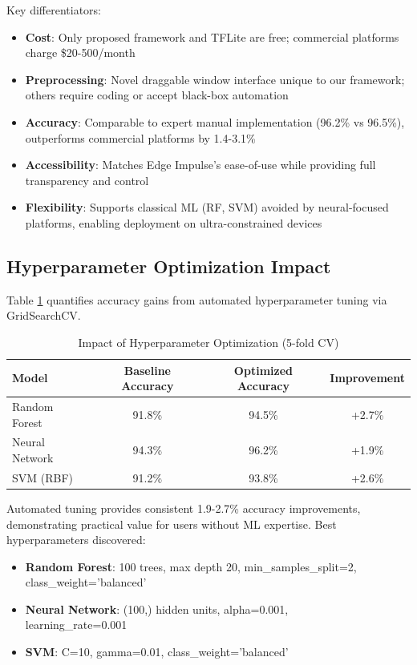 Key differentiators:
\begin{itemize}
    \item \textbf{Cost}: Only proposed framework and TFLite are free; commercial platforms charge \$20-500/month
    \item \textbf{Preprocessing}: Novel draggable window interface unique to our framework; others require coding or accept black-box automation
    \item \textbf{Accuracy}: Comparable to expert manual implementation (96.2\% vs 96.5\%), outperforms commercial platforms by 1.4-3.1\%
    \item \textbf{Accessibility}: Matches Edge Impulse's ease-of-use while providing full transparency and control
    \item \textbf{Flexibility}: Supports classical ML (RF, SVM) avoided by neural-focused platforms, enabling deployment on ultra-constrained devices
\end{itemize}

\subsection{Hyperparameter Optimization Impact}
Table \ref{tab:hyperopt_impact} quantifies accuracy gains from automated hyperparameter tuning via GridSearchCV.

\begin{table}[H]
    \centering
    \caption{Impact of Hyperparameter Optimization (5-fold CV)}
    \begin{tabular}{@{}lccc@{}}
        \toprule
        Model & Baseline Accuracy & Optimized Accuracy & Improvement \\
        \midrule
        Random Forest & 91.8\% & 94.5\% & +2.7\% \\
        Neural Network & 94.3\% & 96.2\% & +1.9\% \\
        SVM (RBF) & 91.2\% & 93.8\% & +2.6\% \\
        \bottomrule
    \end{tabular}
    \label{tab:hyperopt_impact}
\end{table}

Automated tuning provides consistent 1.9-2.7\% accuracy improvements, demonstrating practical value for users without ML expertise. Best hyperparameters discovered:
\begin{itemize}
    \item \textbf{Random Forest}: 100 trees, max depth 20, min\_samples\_split=2,\\
          class\_weight='balanced'
    \item \textbf{Neural Network}: (100,) hidden units, alpha=0.001,\\
          learning\_rate=0.001
    \item \textbf{SVM}: C=10, gamma=0.01, class\_weight='balanced'
\end{itemize}

